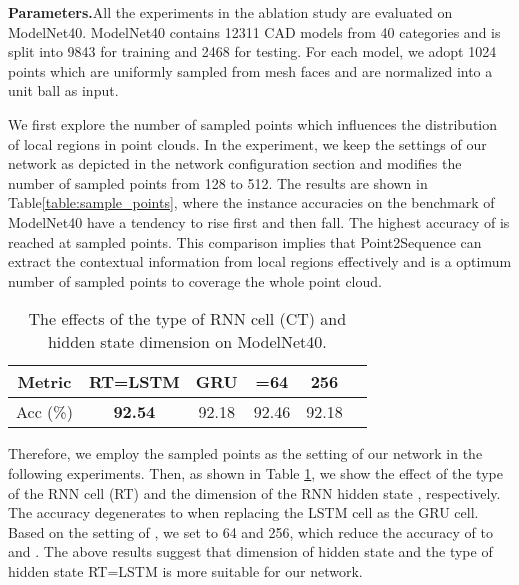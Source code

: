 \documentclass[letterpaper]{article}
\begin{document}
\noindent
\newline
\textbf{Parameters.}\quad All the experiments in the ablation study are evaluated on ModelNet40. ModelNet40 contains 12311 CAD models from 40 categories and is split into 9843 for training and 2468 for testing.
For each model, we adopt 1024 points which are uniformly sampled from mesh faces and are normalized into a unit ball as input.

We first explore the number of sampled points  which influences the distribution of local regions in point clouds. 
In the experiment, we keep the settings of our network as depicted in the network configuration section and modifies the number of sampled points  from 128 to 512.
The results are shown in Table\ref{table:sample_points}, where the instance accuracies on the benchmark of ModelNet40 have a tendency to rise first and then fall. 
The highest accuracy of  is reached at  sampled points.
This comparison implies that Point2Sequence can extract the contextual information from local regions effectively and  is a optimum number of sampled points to coverage the whole point cloud.

\begin{table}[htp]
\centering
\caption{The effects of the type of RNN cell (CT) and hidden state dimension  on ModelNet40.}
\label{table:rnn}
\begin{tabular}{cccccc}\hline
Metric&RT=LSTM&GRU&=64&256\\ \hline
Acc (\%)&\textbf{92.54}&92.18&92.46&92.18\\ \hline
\end{tabular}
\end{table}
Therefore, we employ the sampled points  as the setting of our network in the following experiments. Then, as shown in Table \ref{table:rnn}, we show the effect of the type of the RNN cell (RT) and the dimension of the RNN hidden state , respectively.
The accuracy degenerates to  when replacing the LSTM cell as the GRU cell.
Based on the setting of , we set  to 64 and 256, which reduce the accuracy of  to  and .
The above results suggest that dimension of hidden state  and the type of hidden state RT=LSTM is more suitable for our network.
\end{document}
